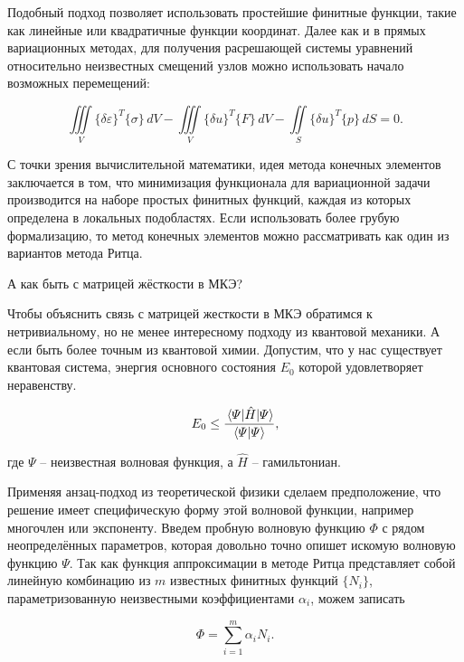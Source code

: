 Подобный подход позволяет использовать простейшие финитные функции, такие как линейные или квадратичные функции координат. Далее как и в прямых вариационных методах, для получения расрешающей системы уравнений относительно неизвестных смещений узлов можно использовать начало возможных перемещений:

\begin{displaymath}
	\iiint\limits_V \{ \delta \varepsilon \}^{T} \{\sigma\} \,dV - \iiint\limits_V \{ \delta u \}^{T} \{ F \} \,dV - \iint\limits_S \{ \delta u \}^{T} \{ p \} \,dS = 0.
\end{displaymath}

С точки зрения вычислительной математики, идея метода конечных элементов заключается в том, что минимизация функционала для вариационной задачи производится на наборе простых финитных функций, каждая из которых определена в локальных подобластях. Если использовать более грубую формализацию, то метод конечных элементов можно рассматривать как один из вариантов метода Ритца.

\newpage
\begin{question}
	А как быть с матрицей жёсткости в МКЭ?
\end{question}

Чтобы объяснить связь с матрицей жесткости в МКЭ обратимся к нетривиальному, но не менее интересному подходу из квантовой механики. А если быть более точным из квантовой химии.
Допустим, что у нас существует квантовая система, энергия основного состояния $E_{0}$ которой удовлетворяет неравенству.

\begin{displaymath}
	E_{0} \leq \frac{\expval{\hat{H}}{\varPsi}}{\bra{\varPsi} \ket{\varPsi}},
\end{displaymath}

\noindent где $\varPsi$ -- неизвестная волновая функция, а $\hat{H}$ -- гамильтониан.

Применяя анзац-подход из теоретической физики сделаем предположение, 
что решение имеет специфическую форму этой волновой функции, например многочлен или экспоненту. Введем пробную волновую функцию $\varPhi$ с рядом неопределённых параметров, 
которая довольно точно опишет искомую волновую функцию $\varPsi$. Так как функция аппроксимации в методе Ритца представляет собой линейную комбинацию из $m$ известных финитных функций $\{ N_{i} \}$, параметризованную неизвестными коэффициентами $\alpha_{i}$, можем записать

\begin{displaymath}
	\varPhi = \sum_{i=1}^{m} \alpha_{i} N_{i}.
\end{displaymath}


